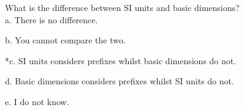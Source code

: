 
What is the difference between SI units and basic dimensions?\\

a. There is no difference.

b. You cannot compare the two.

*c. SI units considers prefixes whilst basic dimensions do not.

d. Basic dimensions considers prefixes whilst SI units do not.

e. I do not know.\\
